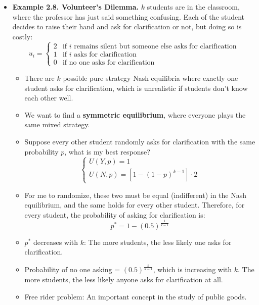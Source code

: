 \documentclass[notitlepage]{article}
\begin{document}
\begin{itemize}
    \begin{figure}[h]
    \centering
    \resizebox{0.35\textwidth}{!}{
    
    }
    \end{figure}

    \item \textbf{Example 2.8. Volunteer's Dilemma.} \(k\) students are in the classroom, where the professor has just said something confusing. Each of the student decides to raise their hand and ask for clarification or not, but doing so is costly:
    \[
    u_i =
    \begin{cases}
        2 &\text{if } i \text{ remains silent but someone else asks for clarification} \\
        1 &\text{if } i \text{ asks for clarification} \\
        0 &\text{if no one asks for clarification}
    \end{cases}
    \]
    \begin{itemize}
        \item There are \(k\) possible pure strategy Nash equilibria where exactly one student asks for clarification, which is unrealistic if students don't know each other well.
        \item We want to find a \textbf{symmetric equilibrium}, where everyone plays the same mixed strategy.
        \item Suppose every other student randomly asks for clarification with the same probability \(p\), what is my best response?
        \[
        \begin{cases}
            U(Y,p) = 1 \\
            U(N,p) = [1-(1-p)^{k-1}] \cdot 2
        \end{cases}
        \]
        \item For me to randomize, these two must be equal (indifferent) in the Nash equilibrium, and the same holds for every other student. Therefore, for every student, the probability of asking for clarification is:
        \[
        p^* = 1-(0.5)^\frac{1}{k-1}
        \]
        \item \(p^*\) decreases with \(k\): The more students, the less likely one asks for clarification.
        \item Probability of no one asking = \((0.5)^\frac{k}{k-1}\), which is increasing with \(k\). The more students, the less likely anyone asks for clarification at all.
        \item Free rider problem: An important concept in the study of public goods.
    \end{itemize}
\end{itemize}
\end{document}
